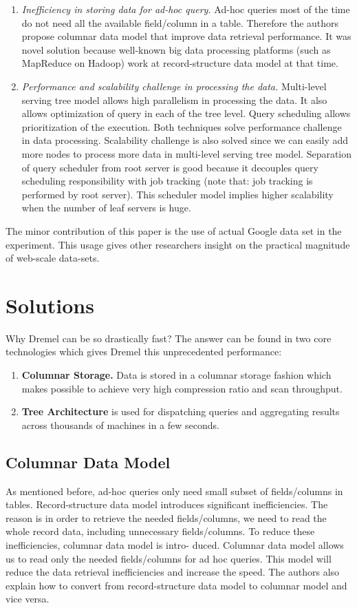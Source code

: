 \documentclass[twocolumn]{article}
\newcommand{\be}{\begin{enumerate}}
\newcommand{\ee}{\end{enumerate}}
\newcommand{\ii}{\item}
\begin{document}
\be
\ii \textit{Inefficiency in storing data for ad-hoc query.}
Ad-hoc queries most of the time do not need all the available field/column in a table. Therefore the authors propose columnar data model that improve data retrieval performance. It was novel solution because well-known big data processing platforms (such as MapReduce on Hadoop) work at record-structure data model at that time.
\ii \textit{Performance and scalability challenge in processing the data.}
Multi-level serving tree model allows high parallelism in processing the data. It also allows optimization of query in each of the tree level. Query scheduling allows prioritization of the execution. Both techniques solve performance challenge in data processing.
Scalability challenge is also solved since we can easily add more nodes to process more data in multi-level serving tree model. Separation of query scheduler from root server is good because it decouples query scheduling responsibility with job tracking (note that: job tracking is performed by root server). This scheduler model implies higher scalability when the number of leaf servers is huge.
\ee
The minor contribution of this paper is the use of actual Google data set in the experiment. 
This usage gives other researchers insight on the practical magnitude of web-scale data-sets.


\section{Solutions}
Why Dremel can be so drastically fast? 
The answer can be found in two core technologies which gives Dremel this unprecedented performance:
\be
\ii \textbf{Columnar Storage.} Data is stored in a columnar storage fashion which makes possible to achieve very high compression ratio and scan throughput.
\ii \textbf{Tree Architecture} is used for dispatching queries and aggregating results across thousands of machines in a few seconds.
\ee

\subsection{Columnar Data Model}
As mentioned before, ad-hoc queries only need small subset of fields/columns in tables. Record-structure data model introduces significant inefficiencies. The reason is in order to retrieve the needed fields/columns, we need to read the whole record data, including unnecessary fields/columns. To reduce these inefficiencies, columnar data model is intro- duced. Columnar data model allows us to read only the needed fields/columns for ad hoc queries. This model will reduce the data retrieval inefficiencies and increase the speed. The authors also explain how to convert from record-structure data model to columnar model and vice versa.
\end{document}
